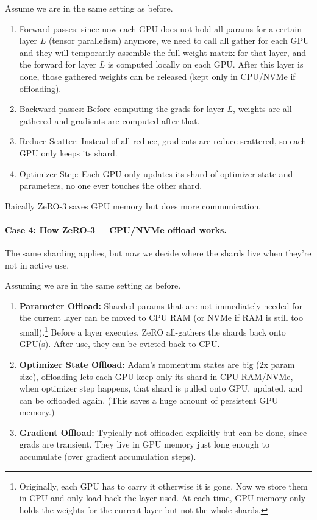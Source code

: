 \documentclass[11pt]{article}  %
\begin{document}
Assume we are in the same setting as before.
\begin{enumerate}
  \item Forward passes: since now each GPU does not hold all params for a certain layer $L$ (tensor parallelism) anymore, we need to call all gather for each GPU and they will temporarily assemble the full weight matrix for that layer, and the forward for layer $L$ is computed locally on each GPU.
  After this layer is done, those gathered weights can be released (kept only in CPU/NVMe if offloading).

  \item Backward passes: Before computing the grads for layer $L$, weights are all gathered and gradients are computed after that.
  
  \item Reduce-Scatter: Instead of all reduce, gradients are reduce-scattered, so each GPU only keeps its shard.
  
  \item Optimizer Step: Each GPU only updates its shard of optimizer state and parameters, no one ever touches the other shard. 
\end{enumerate}
Baically ZeRO-3 saves GPU memory but does more communication.


\paragraph{Case 4: How ZeRO-3 + CPU/NVMe offload works.}
The same sharding applies, but now we decide where the shards live when they're not in active use.

Assuming we are in the same setting as before.
\begin{enumerate}
  \item \textbf{Parameter Offload:} Sharded params that are not immediately needed for the current layer can be moved to CPU RAM (or NVMe if RAM is still too small).\footnote{Originally, each GPU has to carry it otherwise it is gone. Now we store them in CPU and only load back the layer used. At each time, GPU memory only holds the weights for the current layer but not the whole shards.}
  Before a layer executes, ZeRO all-gathers the shards back onto GPU(s). After use, they can be evicted back to CPU.

  \item \textbf{Optimizer State Offload:} Adam's momentum states are big (2x param size), offloading lets each GPU keep only its shard in CPU RAM/NVMe, when optimizer step happens, that shard is pulled onto GPU, updated, and can be offloaded again. (This saves a huge amount of persistent GPU memory.)
  
  \item \textbf{Gradient Offload:} Typically not offloaded explicitly but can be done, since grads are transient. They live in GPU memory just long enough to accumulate (over gradient accumulation steps).
\end{enumerate}
\end{document}
